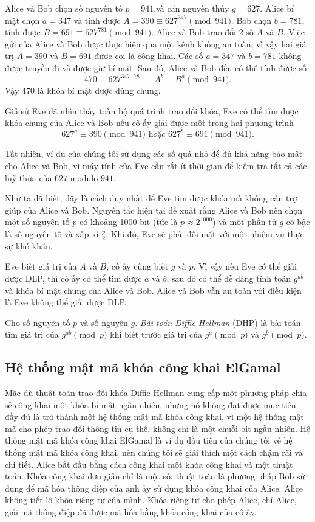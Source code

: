 \begin{example}
	Alice và Bob chọn số nguyên tố $p = 941$,và căn nguyên thủy $g = 627$.
	Alice bí mật chọn $a= 347$ và tính được $A = 390 \equiv 627^{347} \pmod{941}$. Bob chọn $b= 781$, tính được $B = 691 \equiv 627^{781} \pmod{941}$. Alice và Bob trao đổi 2 số $A$ và $B$. Việc gửi của Alice và Bob được
	thực hiện qua một kênh không an toàn, vì vậy hai giá trị $A = 390$ và $B = 691$
	được coi là công khai. Các số $a = 347$ và $b = 781$ không được
	truyền đi và được giữ bí mật. Sau đó, Alice và Bob đều có thể tính được số
	$$ 470 \equiv 627 ^{347 \cdot 781} \equiv A^b \equiv B^a \pmod{941}.$$
	Vậy $470$ là khóa bí mật được dùng chung.
\end{example}
Giả sử Eve đã nhìn thấy toàn bộ quá trình trao đổi khóa, Eve có thể tìm được khóa chung của Alice và Bob nếu cô ấy giải được một trong hai phương trình
$$627^a \equiv 390 \pmod{941} \textit{ hoặc } 627^b \equiv 691 \pmod{941}.$$


Tất nhiên, ví dụ của chúng tôi sử dụng các số quá nhỏ để đủ khả năng bảo
mật cho Alice và Bob, vì máy tính của Eve cần rất ít thời gian để kiểm
tra tất cả các luỹ thừa của $627$ modulo $941$.

Như ta đã biết, đây là cách duy nhất để Eve tìm được khóa mà không cần trợ giúp của Alice và Bob. Nguyên tắc hiện tại đề xuất rằng
Alice và Bob nên chọn một số nguyên tố $p$ có khoảng 1000 bit (tức là $p \approx 2^{1000}$) và
một phần tử $g$ có bậc là số nguyên tố và xấp xỉ $\frac{p}{2}$. Khi đó, Eve sẽ phải đối mặt với một nhiệm vụ thực sự khó khăn.

Eve biết giá trị của $A$ và $B$, cô ấy cũng biết $g$ và $p$.
Vì vậy nếu Eve có thể giải được DLP, thì cô ấy
có thể tìm được $a$ và $b$, sau đó có thể dễ dàng tính toán $g^{ab}$ và khóa bí mật
chung của Alice và Bob. Alice và Bob vẫn an toàn với điều kiện là Eve
không thể giải được DLP.

\begin{definition}
	Cho số nguyên tố $p$ và số nguyên $g$. \textit{Bài toán Diffie-Hellman} (DHP) là bài toán tìm giá trị của $g^{ab} \pmod{p}$ khi biết trước giá trị của $g^a \pmod{p}$ và $g^b \pmod{p}$.
\end{definition}

\subsection{Hệ thống mật mã khóa công khai ElGamal}
Mặc dù thuật toán trao đổi khóa Diffie-Hellman cung cấp một phương pháp
chia sẻ công khai một khóa bí mật ngẫu nhiên, nhưng nó không đạt được mục
tiêu đầy đủ là trở thành một hệ thống mật mã khóa công khai, vì một hệ thống
mật mã cho phép trao đổi thông tin cụ thể, không chỉ là một chuỗi bit ngẫu
nhiên.
Hệ thống mật mã khóa công khai ElGamal là ví dụ đầu tiên của chúng tôi về
hệ thống mật mã khóa công khai, nên chúng tôi sẽ giải thích một cách chậm rãi và chi tiết. Alice bắt đầu bằng cách công khai một khóa công khai và một thuật toán. Khóa công khai đơn giản chỉ là một số, thuật toán là phương pháp Bob sử dụng để mã hóa thông điệp của anh ấy sử dụng khóa công khai của Alice.
Alice không tiết lộ khóa riêng tư của mình. Khóa riêng tư cho phép Alice, chỉ Alice, giải mã thông điệp đã được mã hóa bằng khóa công khai của cô ấy.


